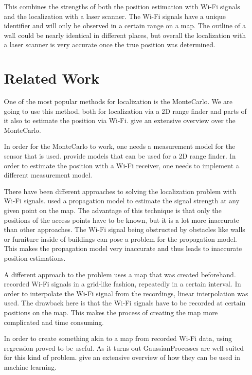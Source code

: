 This combines the strengths of both the position estimation with Wi-Fi signals and the localization with a laser scanner. The Wi-Fi signals have a unique identifier and will only be observed in a certain range on a map. The outline of a wall could be nearly identical in different places, but overall the localization with a laser scanner is very accurate once the true position was determined. 

\section{Related Work}
One of the most popular methods for localization is the \Gls{MonteCarlo}. We are going to use this method, both for localization via a 2D range finder and parts of it also to estimate the position via Wi-Fi. \citet{Thrun:2005:PR:1121596} give an extensive overview over the \Gls{MonteCarlo}.

In order for the \Gls{MonteCarlo} to work, one needs a measurement model for the sensor that is used. \citet{Thrun:2005:PR:1121596} provide models that can be used for a 2D range finder. In order to estimate the position with a Wi-Fi receiver, one needs to implement a different measurement model.

There have been different approaches to solving the localization problem with Wi-Fi signals. \citet{serrano2012robot} used a propagation model to estimate the signal strength at any given point on the map. The advantage of this technique is that only the positions of the access points have to be known, but it is a lot more inaccurate than other approaches. The Wi-Fi signal being obstructed by obstacles like walls or furniture inside of buildings can pose a problem for the propagation model. This makes the propagation model very inaccurate and thus leads to inaccurate position estimations.

A different approach to the problem uses a map that was created beforehand. \citet{biswas2010wifi} recorded Wi-Fi signals in a grid-like fashion, repeatedly in a certain interval. In order to interpolate the Wi-Fi signal from the recordings, linear interpolation was used. The drawback here is that the Wi-Fi signals have to be recorded at certain positions on the map. This makes the process of creating the map more complicated and time consuming.

In order to create something akin to a map from recorded Wi-Fi data, using regression proved to be useful. As it turns out \Gls{GaussianProcess}es are well suited for this kind of problem. \citet{Rasmussen:2005:GPM:1162254} give an extensive overview of how they can be used in machine learning. 

